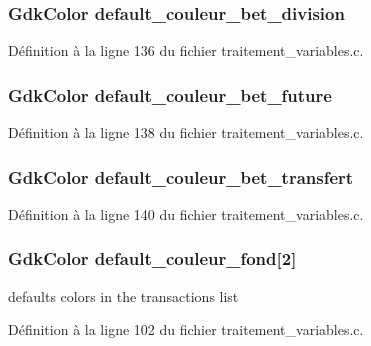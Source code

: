 \subsubsection[{default\_\-couleur\_\-bet\_\-division}]{\setlength{\rightskip}{0pt plus 5cm}GdkColor {\bf default\_\-couleur\_\-bet\_\-division}}\label{affichage_8c_a8429a293f7b484c7ddd18477b5826837}


Définition à la ligne 136 du fichier traitement\_\-variables.c.

\subsubsection[{default\_\-couleur\_\-bet\_\-future}]{\setlength{\rightskip}{0pt plus 5cm}GdkColor {\bf default\_\-couleur\_\-bet\_\-future}}\label{affichage_8c_adba548ffc8e18696333d5a1c307f4c16}


Définition à la ligne 138 du fichier traitement\_\-variables.c.

\subsubsection[{default\_\-couleur\_\-bet\_\-transfert}]{\setlength{\rightskip}{0pt plus 5cm}GdkColor {\bf default\_\-couleur\_\-bet\_\-transfert}}\label{affichage_8c_aeb871339509ce469b886f7e5e302c85a}


Définition à la ligne 140 du fichier traitement\_\-variables.c.

\subsubsection[{default\_\-couleur\_\-fond}]{\setlength{\rightskip}{0pt plus 5cm}GdkColor {\bf default\_\-couleur\_\-fond}[2]}\label{affichage_8c_a825451c26e17de125aef98ca62e96358}
defaults colors in the transactions list 

Définition à la ligne 102 du fichier traitement\_\-variables.c.

